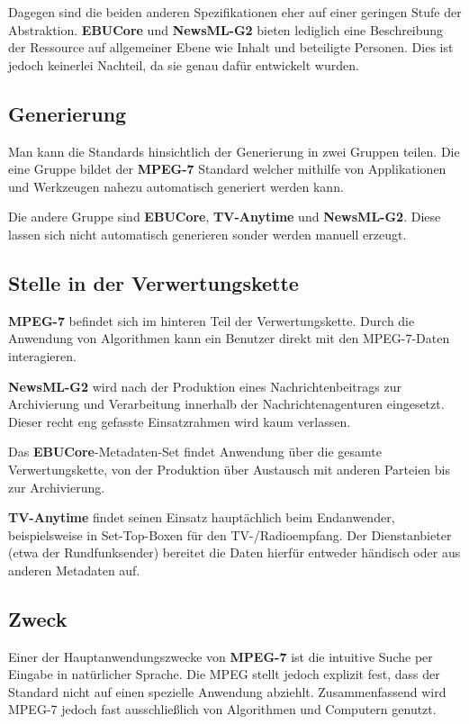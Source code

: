 	Dagegen sind die beiden anderen Spezifikationen eher auf einer geringen Stufe der Abstraktion. \textbf{EBUCore} und \textbf{NewsML-G2} bieten lediglich eine Beschreibung der Ressource auf allgemeiner Ebene wie Inhalt und beteiligte Personen. Dies ist jedoch keinerlei Nachteil, da sie genau dafür entwickelt wurden.

	\subsection{Generierung}
	Man kann die Standards hinsichtlich der Generierung in zwei Gruppen teilen. Die eine Gruppe bildet der \textbf{MPEG-7} Standard welcher mithilfe von Applikationen und Werkzeugen nahezu automatisch generiert werden kann.
	
	Die andere Gruppe sind \textbf{EBUCore}, \textbf{TV-Anytime} und \textbf{NewsML-G2}. Diese lassen sich nicht automatisch generieren sonder werden manuell erzeugt.

	\subsection{Stelle in der Verwertungskette}
	\textbf{MPEG-7} befindet sich im hinteren Teil der Verwertungskette. Durch die Anwendung von Algorithmen kann ein Benutzer direkt mit den MPEG-7-Daten interagieren. %
	
	\textbf{NewsML-G2} wird nach der Produktion eines Nachrichtenbeitrags zur Archivierung und Verarbeitung innerhalb der Nachrichtenagenturen eingesetzt. Dieser recht eng gefasste Einsatzrahmen wird kaum verlassen.
	
	Das \textbf{EBUCore}-Metadaten-Set findet Anwendung über die gesamte Verwertungskette, von der Produktion über Austausch mit anderen Parteien bis zur Archivierung.
	
	\textbf{TV-Anytime} findet seinen Einsatz hauptächlich beim Endanwender, beispielsweise in Set-Top-Boxen für den TV-/Radioempfang. Der Dienstanbieter (etwa der Rundfunksender) bereitet die Daten hierfür entweder händisch oder aus anderen Metadaten auf.

	\subsection{Zweck}
	Einer der Hauptanwendungszwecke von \textbf{MPEG-7} ist die intuitive Suche per Eingabe in natürlicher Sprache. Die MPEG stellt jedoch explizit fest, dass der Standard nicht auf einen spezielle Anwendung abziehlt. Zusammenfassend wird MPEG-7 jedoch fast ausschließlich von Algorithmen und Computern genutzt.

